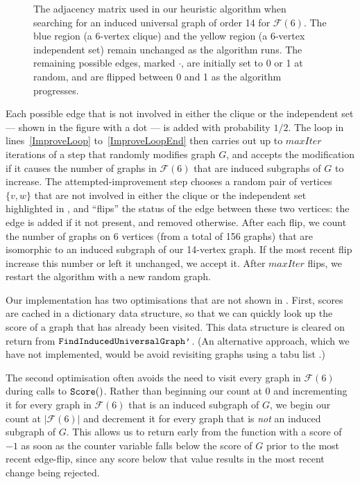 \documentclass[12pt]{article}
\newcommand{\calF}{\ensuremath{\mathcal{F}}}
\newcommand{\AlgVar}[1]{\mathit{#1}}
\newcommand{\linerangeref}[2]{lines~\ref{#1} to~\ref{#2}}
\begin{document}
\begin{figure}[h!]
    \centering
    \footnotesize
    \caption{The adjacency matrix used in our heuristic algorithm when searching
        for an induced universal graph of order 14 for $\calF(6)$.  The blue
        region (a 6-vertex clique) and the yellow region (a 6-vertex independent
        set) remain unchanged as the algorithm runs.  The remaining possible edges,
        marked $\boldsymbol{\cdot}$, are initially set to 0 or 1 at random,
        and are flipped between 0 and 1 as the algorithm progresses.}
\label{fig:heuristic-regions}
\end{figure}

Each possible edge that is not involved in either the clique or the independent
set --- shown in the figure with a dot --- is added with probability $1/2$.
The loop in \linerangeref{ImproveLoop}{ImproveLoopEnd} then carries out up to
$\AlgVar{maxIter}$ iterations of a step that randomly modifies graph $G$,
and accepts the modification if it causes the number of graphs in $\calF(6)$ that
are induced subgraphs of $G$ to increase.
The attempted-improvement step chooses a random pair of vertices $\{v, w\}$ that
are not involved in either the clique or the independent set
highlighted in , and
``flips'' the status of the edge between these two vertices: the edge is added if it
not present, and removed otherwise.
After each flip, we count the number of graphs on 6 vertices (from a total
of 156 graphs) that are
isomorphic to an induced subgraph of our 14-vertex graph.  If the most recent flip
increase this number or left it unchanged, we accept it.  After $\AlgVar{maxIter}$
flips, we restart the algorithm with a new random graph.

Our implementation has two optimisations that are not shown in .
First, scores are cached in a dictionary data structure, so that we can quickly look
up the score of a graph that has already been visited. This data structure is
cleared on return from $\FuncSty{FindInducedUniversalGraph'}$.
(An alternative approach, which we have not implemented, would be avoid
revisiting graphs using a tabu list \cite{DBLP:books/daglib/0093574}.)

The second optimisation often avoids the need to visit every graph in $\calF(6)$
during calls to $\FuncSty{Score}()$.  Rather than beginning our count at 0
and incrementing it for every graph in $\calF(6)$ that is an induced subgraph
of $G$, we begin our count at $|\calF(6)|$ and decrement it for every
graph that is \emph{not} an induced subgraph of $G$.  This allows us to return
early from the function with a score of $-1$ as soon as the counter variable
falls below the score of $G$ prior to the most recent edge-flip, since any
score below that value results in the most recent change being rejected.
\end{document}
